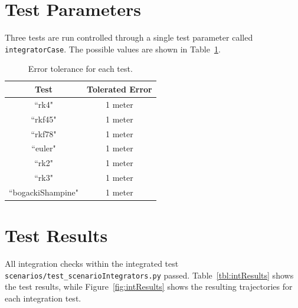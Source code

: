 \section{Test Parameters}
Three tests are run controlled through a single test parameter called {\tt integratorCase}.  The possible values are shown in Table~\ref{tbl:intCases}.

\begin{table}[htbp]
	\caption{Error tolerance for each test.}
	\label{tbl:intCases}
	\centering \fontsize{10}{10}\selectfont
	\begin{tabular}{ c | c } %
		\hline\hline
		\textbf{Test}   	      	               & \textbf{Tolerated Error} 						           \\ \hline
		``rk4"                           & 1 meter	  \\
		``rkf45"                           & 1 meter	  \\
		``rkf78"                           & 1 meter	  \\
		``euler"                           & 1 meter	  \\
		``rk2"                           & 1 meter	  \\
		``rk3"                           & 1 meter	  \\
		``bogackiShampine"                           & 1 meter	  \\
		\hline\hline
	\end{tabular}
\end{table}

\section{Test Results}
All integration checks within the integrated test {\tt scenarios/test\_scenarioIntegrators.py} passed.  Table~\ref{tbl:intResults} shows the test results, while Figure~\ref{fig:intResults} shows the resulting trajectories for each integration test.



